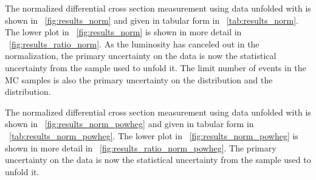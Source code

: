 The normalized differential cross section measurement using data unfolded with
\MADGRAPH is shown in \FIG~\ref{fig:results_norm} and given in tabular form in
\TAB~\ref{tab:results_norm}. The lower plot in \FIG~\ref{fig:results_norm} is
shown in more detail in \FIG~\ref{fig:results_ratio_norm}. As the luminosity
has canceled out in the normalization, the primary uncertainty on the data is
now the statistical uncertainty from the \MADGRAPH sample used to unfold it.
The limit number of events in the MC samples is also the primary uncertainty on
the \MADGRAPH distribution and the \POWHEG distribution.




The normalized differential cross section measurement using data unfolded with
\POWHEG is shown in \FIG~\ref{fig:results_norm_powheg} and given in tabular
form in \TAB~\ref{tab:results_norm_powheg}. The lower plot in
\FIG~\ref{fig:results_norm_powheg} is shown in more detail in
\FIG~\ref{fig:results_ratio_norm_powheg}. The primary uncertainty on the data
is now the statistical uncertainty from the \POWHEG sample used to unfold it.



